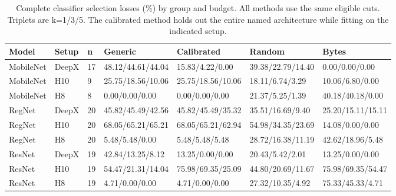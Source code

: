 \begin{table}[t]
\centering
\caption{Complete classifier selection losses (\%) by group and budget. All methods use the same eligible cuts. Triplets are k=1/3/5. The calibrated method holds out the entire named architecture while fitting on the indicated setup.}
\label{tab:supp-calibration-groups}
\begingroup\small\setlength{\tabcolsep}{3pt}
\begin{tabular}{lllllll}
\toprule
Model & Setup & n & Generic & Calibrated & Random & Bytes \\
\midrule
MobileNet & DeepX & 17 & 48.12/44.61/44.04 & 15.83/4.22/0.00 & 39.38/22.79/14.40 & 0.00/0.00/0.00 \\
MobileNet & H10 & 9 & 25.75/18.56/10.06 & 25.75/18.56/10.06 & 18.11/6.74/3.29 & 10.06/6.80/0.00 \\
MobileNet & H8 & 8 & 0.00/0.00/0.00 & 0.00/0.00/0.00 & 21.37/5.25/1.39 & 40.18/40.18/0.00 \\
RegNet & DeepX & 20 & 45.82/45.49/42.56 & 45.82/45.49/35.32 & 35.51/16.69/9.40 & 25.20/15.11/15.11 \\
RegNet & H10 & 20 & 68.05/65.21/65.21 & 68.05/65.21/62.94 & 54.98/34.35/23.69 & 14.08/0.00/0.00 \\
RegNet & H8 & 20 & 5.48/5.48/0.00 & 5.48/5.48/5.48 & 28.72/16.38/11.19 & 42.62/18.96/5.48 \\
ResNet & DeepX & 19 & 42.84/13.25/8.12 & 13.25/0.00/0.00 & 20.43/5.42/2.01 & 13.25/0.00/0.00 \\
ResNet & H10 & 19 & 54.47/21.31/14.04 & 75.98/69.35/25.09 & 44.80/20.69/11.67 & 75.98/69.35/54.47 \\
ResNet & H8 & 19 & 4.71/0.00/0.00 & 4.71/0.00/0.00 & 27.32/10.35/4.92 & 75.33/45.33/4.71 \\
\bottomrule
\end{tabular}
\endgroup
\end{table}
